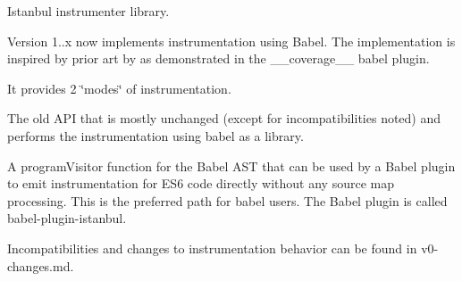 \href{https://travis-ci.org/istanbuljs/istanbul-lib-instrument}{\tt }

Istanbul instrumenter library.

Version 1..\+x now implements instrumentation using {\ttfamily Babel}. The implementation is inspired by prior art by  as demonstrated in the {\ttfamily \+\_\+\+\_\+coverage\+\_\+\+\_\+} babel plugin.

It provides 2 \char`\"{}modes\char`\"{} of instrumentation.


\begin{DoxyItemize}
\item The old A\+PI that is mostly unchanged (except for incompatibilities noted) and performs the instrumentation using babel as a library.
\item A {\ttfamily program\+Visitor} function for the Babel A\+ST that can be used by a Babel plugin to emit instrumentation for E\+S6 code directly without any source map processing. This is the preferred path for babel users. The Babel plugin is called {\ttfamily babel-\/plugin-\/istanbul}.
\end{DoxyItemize}

Incompatibilities and changes to instrumentation behavior can be found in v0-\/changes.md. 